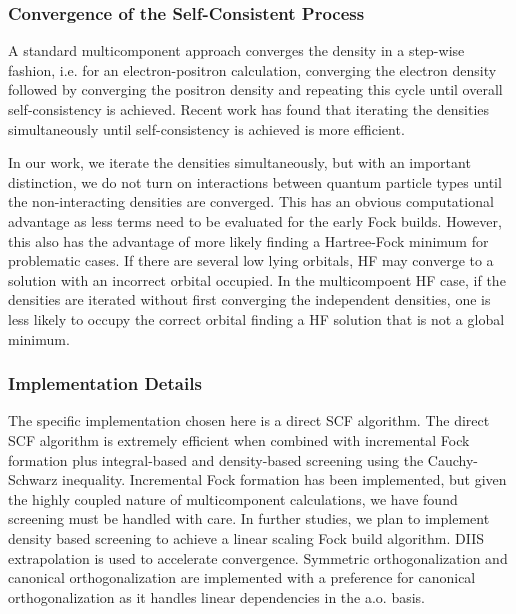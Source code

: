 \subsubsection{Convergence of the Self-Consistent Process}
A standard multicomponent approach converges the density in a step-wise fashion, i.e. for an electron-positron calculation, converging the electron density followed by converging the positron density and repeating this cycle until overall self-consistency is achieved.\cite{10.1021/acs.jpca.2c05172}
Recent work has found that iterating the densities simultaneously until self-consistency is achieved is more efficient.\cite{10.1021/acs.jpca.2c05172}

In our work, we iterate the densities simultaneously, but with an important distinction, we do not turn on interactions between quantum particle types until the non-interacting densities are converged.
This has an obvious computational advantage as less terms need to be evaluated for the early Fock builds.
However, this also has the advantage of more likely finding a Hartree-Fock minimum for problematic cases.
If there are several low lying orbitals, HF may converge to a solution with an incorrect orbital occupied.
In the multicompoent HF case, if the densities are iterated without first converging the independent densities, one is less likely to occupy the correct orbital finding a HF solution that is not a global minimum.

\subsubsection{Implementation Details}
The specific implementation chosen here is a direct SCF algorithm.
The direct SCF algorithm is extremely efficient when combined with incremental Fock formation plus integral-based and density-based screening using the Cauchy-Schwarz inequality.
Incremental Fock formation has been implemented, but given the highly coupled nature of multicomponent calculations, we have found screening must be handled with care.
In further studies, we plan to implement density based screening to achieve a linear scaling Fock build algorithm.
DIIS extrapolation is used to accelerate convergence.
Symmetric orthogonalization and canonical orthogonalization are implemented with a preference for canonical orthogonalization as it handles linear dependencies in the a.o. basis.


